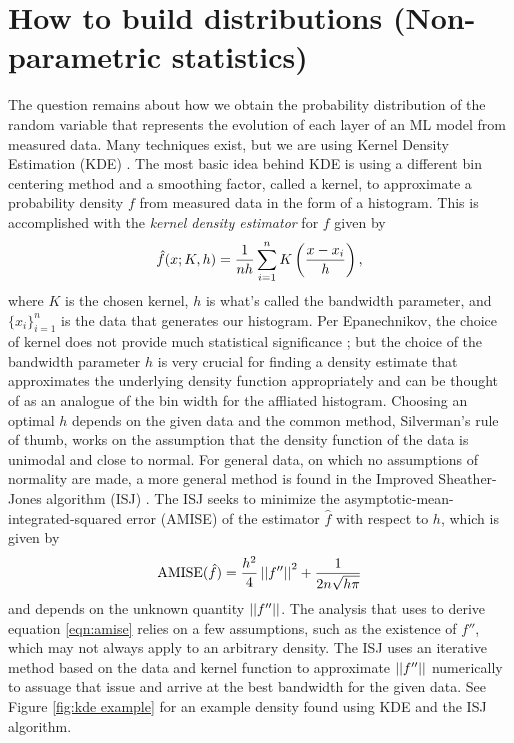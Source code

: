 \section{How to build distributions (Non-parametric statistics)}
The question remains about how we obtain the probability distribution of the random 
variable that represents the evolution of each layer of an ML model from measured data. 
Many techniques exist, but we are using Kernel Density Estimation (KDE) \cite{rosenblatt, parzen}. 
The most 
basic idea behind KDE is using a different bin centering method and a smoothing factor, 
called a kernel, to approximate a probability density $f$ from measured data in the form 
of a histogram. This is accomplished with the \emph{kernel density estimator} for $f$
given by
\begin{equation}
    \hat{f}(x; K, h) = \frac{1}{nh}\sum_{i = 1}^n K\left(\frac{x - x_i}{h}\right),
\end{equation}
where $K$ is the chosen kernel, $h$ is what's called the bandwidth parameter, and 
$\{x_i\}_{i=1}^n$ is the data that generates our histogram. Per Epanechnikov, 
the choice of kernel does not provide much statistical significance \cite{epanechnikov}; 
but the choice of the bandwidth parameter $h$ is very crucial for finding a density estimate
that approximates the underlying density function appropriately and can be thought of as an 
analogue of the bin width for the affliated histogram. Choosing an optimal $h$ depends on 
the given data and the common method, Silverman's rule of thumb, works on the 
assumption that the density function of the data is unimodal and close to 
normal. For general data, on which no assumptions of normality are made, a more 
general method is found in the Improved Sheather-Jones algorithm (ISJ) \cite{botev}. 
The ISJ seeks to minimize the asymptotic-mean-integrated-squared error (AMISE) of 
the estimator $\hat{f}$ with respect to $h$, which is given by 
\begin{equation}
    \text{AMISE}(\hat{f}) = \frac{h^2}{4}\left|\left|f''\right|\right|^2 + \frac{1}{2n\sqrt{h\pi}}
    \label{eqn:amise}
\end{equation}
and depends on the unknown quantity $\left|\left|f''\right|\right|$. The analysis that \cite{terrell} uses
to derive equation \ref{eqn:amise} relies on a few assumptions, such as the existence 
of $f''$, which may not always apply to an arbitrary density.
The ISJ uses an 
iterative method based on the data and kernel function to approximate $\left|\left|f''\right|\right|$ 
numerically to assuage that issue and arrive at 
the best bandwidth for the given data. See Figure \ref{fig:kde example} for an example 
density found using KDE and the ISJ algorithm.

